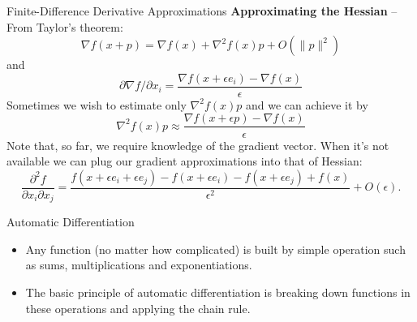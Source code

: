 \documentclass{beamer}
\begin{document}
\begin{frame}[allowframebreaks]{Finite-Difference Derivative Approximations}
	\textbf{Approximating the Hessian} -- From Taylor's theorem:
	\[
		\nabla f(x+p) = \nabla f(x) + \nabla^2 f(x) p + O(\| p \|^2)
	\]
	and
	\[
		\partial \nabla f / \partial x_i = \frac{\nabla f(x+\epsilon e_i) - \nabla f(x)}{\epsilon}
	\]
	Sometimes we wish to estimate only $\nabla^2 f(x) p$ and we can achieve it by
	\[
		\nabla^2 f(x) p \approx \frac{\nabla f(x+\epsilon p) - \nabla f(x)}{\epsilon}
	\]
	Note that, so far, we require knowledge of the gradient vector. When it's not available we can plug our gradient approximations into that of Hessian:
	\begin{equation}
	\frac{\partial^2 f}{\partial x_i \partial x_j} = \frac{f(x+\epsilon e_i + \epsilon e_j) - f(x+\epsilon e_i) - f(x+\epsilon e_j) + f(x)}{\epsilon^2} + O(\epsilon).
	\end{equation}
\end{frame}

\begin{frame}{Automatic Differentiation}
	\begin{itemize}
		\item Any function (no matter how complicated) is built by simple operation such as sums, multiplications and exponentiations. 
		\item The basic principle of automatic differentiation is breaking down functions in these operations and applying the chain rule.
	\end{itemize}
\end{frame} 
\end{document}
